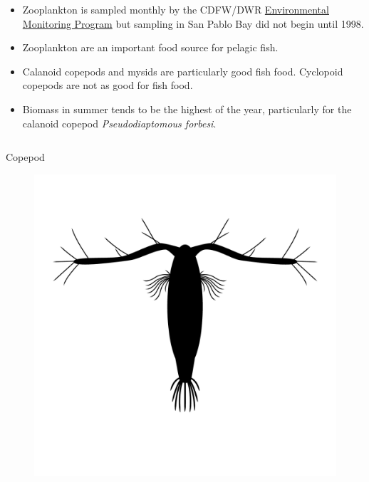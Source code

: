 \documentclass[
]{book}
\providecommand{\tightlist}{%
  \setlength{\itemsep}{0pt}\setlength{\parskip}{0pt}}
\begin{document}
\begin{columns-nocenter}

\begin{column}

\begin{itemize}
\tightlist
\item
  Zooplankton is sampled monthly by the CDFW/DWR \href{https://emp.baydeltalive.com/wiki/12297}{Environmental Monitoring Program} but sampling in San Pablo Bay did not begin until 1998.
\item
  Zooplankton are an important food source for pelagic fish.
\item
  Calanoid copepods and mysids are particularly good fish food. Cyclopoid copepods are not as good for fish food.
\item
  Biomass in summer tends to be the highest of the year, particularly for the calanoid copepod \emph{Pseudodiaptomous forbesi}.
\end{itemize}

\end{column}

\begin{column}

Copepod

\begin{figure}

{\centering \includegraphics[width=16.67in]{figures/acartia} 

}
\end{figure}
\end{column}
\end{columns-nocenter}
\end{document}
